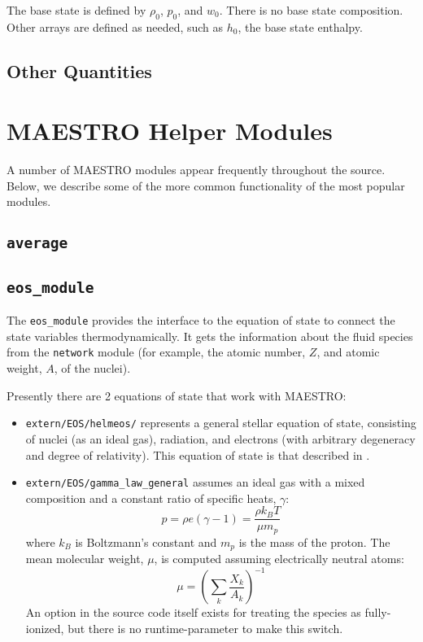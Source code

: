 The base state is defined by $\rho_0$, $p_0$, and $w_0$.  There is no
base state composition.  Other arrays are defined as needed, such as
$h_0$, the base state enthalpy.

\subsection{Other Quantities}


\section{MAESTRO Helper Modules}

A number of MAESTRO modules appear frequently throughout the source.
Below, we describe some of the more common functionality of the most
popular modules.

\subsection{\tt average}

\subsection{{\tt eos\_module}}

The {\tt eos\_module} provides the interface to the equation of 
state to connect the state variables thermodynamically.  It 
gets the information about the fluid species from the {\tt network}
module (for example, the atomic number, $Z$, and atomic weight, $A$,
of the nuclei).

Presently there are 2 equations of state that work with MAESTRO:
\begin{itemize}
\item {\tt extern/EOS/helmeos/} represents a general stellar equation 
      of state, consisting of nuclei (as an ideal gas), radiation,
      and electrons (with arbitrary degeneracy and degree of relativity).
      This equation of state is that described in \cite{timmes_eos}.

\item {\tt extern/EOS/gamma\_law\_general} assumes an ideal gas with a mixed 
     composition and a constant ratio of specific heats, $\gamma$:
      \begin{equation}
      p = \rho e (\gamma - 1) = \frac{\rho k_B T}{\mu m_p} 
      \end{equation}
     where $k_B$ is Boltzmann's constant and $m_p$ is the mass of the
     proton.
     The mean molecular weight, $\mu$, is computed assuming 
     electrically neutral atoms:
     \begin{equation}
     \mu = \left ( \sum_k \frac{X_k}{A_k} \right )^{-1}
     \end{equation}
     An option in the source code itself exists for treating the
     species as fully-ionized, but there is no runtime-parameter to
     make this switch.
\end{itemize}


